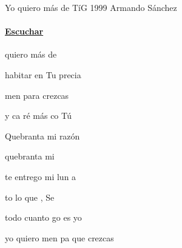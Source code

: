 \documentclass[12pt, spanish]{book}
\begin{document}
    \begin{song}{Yo quiero más de Tí}{G}
        {1999} %
        {Armando Sánchez}
        {} %
        {}
        \ifChordBk
        \paragraph{\mbox{}\hfill\protect\href{https://open.spotify.com/intl-es/track/0daW3KFDC6m1fCynnz0gKE}{Escuchar}\mbox{}\hfill}
        \fi


        \begin{SBOpGroup}
             quiero más de 

             habitar en Tu precia

            men para  crezcas 

            y ca  ré más co Tú
        \end{SBOpGroup}

        \begin{SBChorus}
            Quebranta mi razón

            quebranta mi 

            te entrego mi lun a 

            to lo que , Se

            todo cuanto go es yo

            yo quiero men pa que crezcas 
        \end{SBChorus}



\end{song}
\end{document}
